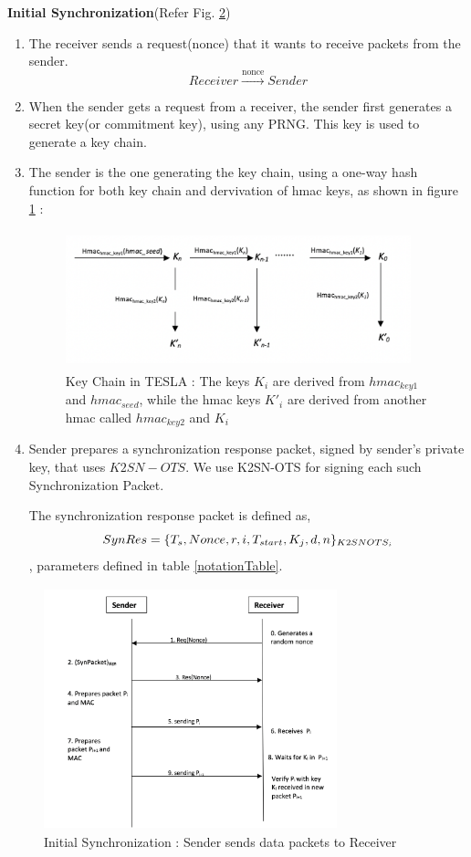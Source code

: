 \textbf{Initial Synchronization}(Refer Fig. \ref{InitialSynchronization})
\begin{enumerate}
\item The receiver sends a request(nonce) that it wants to receive packets from the sender.
\[Receiver \xrightarrow{\text{nonce}}Sender\]
\item When the sender gets a request from a receiver, the sender first generates a secret key(or commitment key), using any PRNG. This key is used to generate a key chain.

\item The sender is the one generating the key chain, using a one-way hash function for both key chain and dervivation of hmac keys, as shown in figure \ref{tesla(keygen)} :
    
    \begin{figure}[H]
    \centering
    \includegraphics[height=4cm,width=10cm]{figures/tesla(keygen).png}
    \caption{Key Chain in TESLA :  The keys $K_{i}$ are derived from $hmac_{key1}$ and $hmac_{seed}$, while the hmac keys $K'_{i}$ are derived from another hmac called $hmac_{key2}$ and $K_{i}$}
    \label{tesla(keygen)}
    \end{figure}

\item Sender prepares a synchronization response packet, signed by sender's private key, that uses $K2SN-OTS$. We use K2SN-OTS for signing each such Synchronization Packet.

The synchronization response packet is defined as, \[SynRes= \{{T_{s},Nonce,r,i,T_{start}, K_{j},d,n}\}_{K2SN\-OTS_{i}}\], parameters defined in table \ref{notationTable}.


\end{enumerate}
\begin{figure}[H]
    \centering
    \includegraphics[height=7cm,width=8.5cm]{figures/tesla1.png}
    \caption{Initial Synchronization : Sender sends data packets to Receiver}
    \label{InitialSynchronization}
\end{figure}

